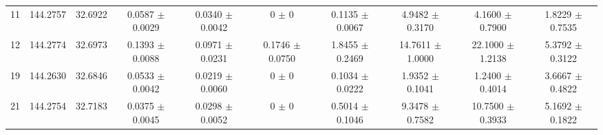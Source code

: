\begin{table*}
\begin{adjustbox}{width=\textwidth, center}
\begin{tabular}{cccccccccc}
        11 &144.2757 & 32.6922 & 0.0587 $\pm$ 0.0029 & 0.0340 $\pm$ 0.0042 & 0 $\pm$ 0 & 0.1135 $\pm$ 0.0067 & 4.9482 $\pm$ 0.3170 & 4.1600 $\pm$ 0.7900 & 1.8229 $\pm$ 0.7535 \\
        12 &144.2774 & 32.6973 & 0.1393 $\pm$ 0.0088 & 0.0971 $\pm$ 0.0231 & 0.1746 $\pm$ 0.0750 & 1.8455 $\pm$ 0.2469 & 14.7611 $\pm$ 1.0000 & 22.1000 $\pm$ 1.2138 & 5.3792 $\pm$ 0.3122 \\
        19 &144.2630 & 32.6846 & 0.0533 $\pm$ 0.0042 & 0.0219 $\pm$ 0.0060 & 0 $\pm$ 0 & 0.1034 $\pm$ 0.0222 & 1.9352 $\pm$ 0.1041 & 1.2400 $\pm$ 0.4014 & 3.6667 $\pm$ 0.4822 \\
        21 &144.2754 & 32.7183 & 0.0375 $\pm$ 0.0045 & 0.0298 $\pm$ 0.0052 & 0 $\pm$ 0 & 0.5014 $\pm$ 0.1046 & 9.3478 $\pm$ 0.7582 & 10.7500 $\pm$ 0.3933 & 5.1692 $\pm$ 0.1822 \\

\end{tabular}
\end{adjustbox}
\end{table*}
